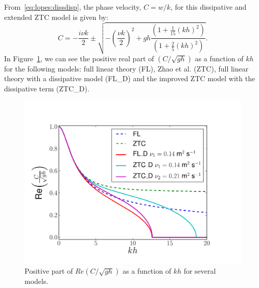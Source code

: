 From~\eqref{eq:lopes:dissdisp}, the phase velocity, $C= w/k$, for this
dissipative and extended ZTC model is given by:
\begin{equation}
\label{eq:lopes:phasevel}
C = -\frac{i\nu k}{2}\pm\sqrt{-\left(\frac{\nu
      k}{2}\right)^2+gh\frac{(1+\frac{1}{15}(kh)^2)}{(1+\frac{2}{5}(kh)^2)}}.
\end{equation}
In Figure~\ref{fig:lopes:dispersion}, we can see the positive real
part of $\displaystyle\left(C/\sqrt{gh}\right)$ as a function of $kh$
for the following models: full linear theory (FL), Zhao et al. (ZTC),
full linear theory with a dissipative model (FL\_D) and the improved
ZTC model with the dissipative term (ZTC\_D).
\begin{figure}
  \begin{center}
    \includegraphics[width=\largefig]{chapters/lopes/pdf/phase_velocity_simple.pdf}
  \end{center}
  \caption{Positive part of $\displaystyle
    Re\left(C/\sqrt{gh}\right)$ as a function of $kh$ for
    several models.}
  \label{fig:lopes:dispersion}
\end{figure}

